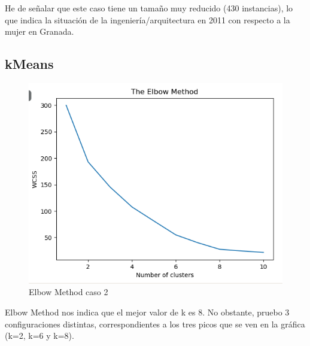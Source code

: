 He de señalar que este caso tiene un tamaño muy reducido (430 instancias), lo que indica la situación de la ingeniería/arquitectura en 2011 con respecto a la mujer en Granada.
\subsection{kMeans}

\begin{figure}[H] %
	\centering
	\includegraphics[scale=0.5]{em-2.png}  %
	\caption{Elbow Method caso 2} 
	\label{fig:em-caso2}
\end{figure}

Elbow Method nos indica que el mejor valor de k es 8. No obstante, pruebo 3 configuraciones distintas, correspondientes a los tres picos que se ven en la gráfica (k=2, k=6 y k=8).

